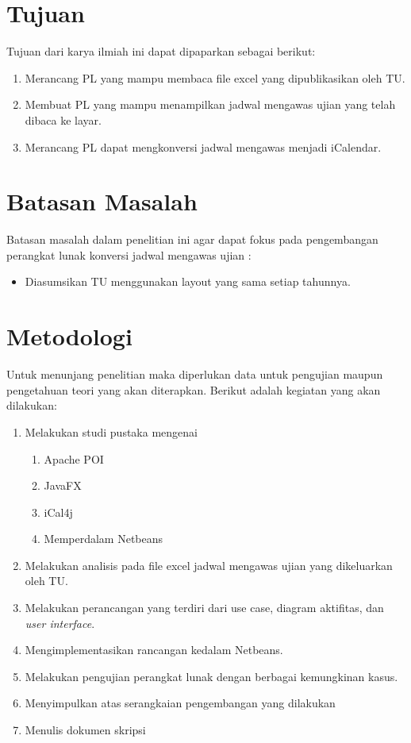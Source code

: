 \section{Tujuan}
\label{sec:tujuan}
Tujuan dari karya ilmiah ini dapat dipaparkan sebagai berikut:
\begin{enumerate}
	\item Merancang PL yang mampu membaca file excel yang dipublikasikan oleh TU.
	\item Membuat PL yang mampu menampilkan jadwal mengawas ujian yang telah dibaca ke layar.
	\item Merancang PL dapat mengkonversi jadwal mengawas menjadi iCalendar.
\end{enumerate}

\section{Batasan Masalah}
\label{sec:batasan}
Batasan masalah dalam penelitian ini agar dapat fokus pada pengembangan perangkat lunak konversi jadwal mengawas ujian :
\begin{itemize}
	\item Diasumsikan TU menggunakan layout yang sama setiap tahunnya.  
\end{itemize}

\section{Metodologi}
\label{sec:metlit}
Untuk menunjang penelitian maka diperlukan data untuk pengujian maupun pengetahuan teori yang akan diterapkan. Berikut adalah kegiatan yang akan dilakukan:
\begin{enumerate}
		\item Melakukan studi pustaka mengenai
			\begin{enumerate}
				\item Apache POI
				\item JavaFX
				\item iCal4j
				\item Memperdalam Netbeans
			\end{enumerate}
		\item Melakukan analisis pada file excel jadwal mengawas ujian yang dikeluarkan oleh TU.
		\item Melakukan perancangan yang terdiri dari use case, diagram aktifitas, dan \textit{user interface}.
		\item Mengimplementasikan rancangan kedalam Netbeans. 
		\item Melakukan pengujian perangkat lunak dengan berbagai kemungkinan kasus.
		\item Menyimpulkan atas serangkaian pengembangan yang dilakukan
		\item Menulis dokumen skripsi
	\end{enumerate}

